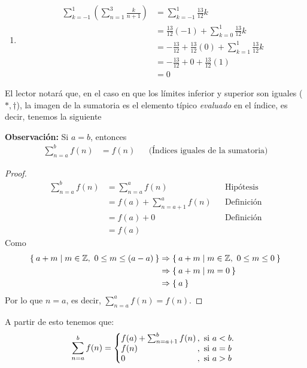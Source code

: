 \begin{enumerate}
  \item \begin{align*}
    \sum_{k=-1}^{1} \left(\sum_{n=1}^{3} \frac{k}{n+1}\right) &= \sum_{k=-1}^{1} \frac{13}{12}k\\
    &= \frac{13}{12} (-1) + \sum_{k=0}^{1} \frac{13}{12}k\\
    &= - \frac{13}{12} + \frac{13}{12} (0) + \sum_{k=1}^{1} \frac{13}{12}k\\
    &= - \frac{13}{12} + 0 + \frac{13}{12} (1)\\
    &= 0
  \end{align*}
\end{enumerate}


  El lector notará que, en el caso en que los límites inferior y superior son iguales ($*, \dag$), la imagen de la sumatoria es el elemento típico \textit{evaluado} en el índice, es decir, tenemos la siguiente

  \textbf{Observación:} Si $a=b$, entonces
  \begin{align*}
    \sum_{n=a}^{b} f(n) &= f(n) && \text{(Índices iguales de la sumatoria)}
  \end{align*}
  
  \begin{proof}\leavevmode
    \begin{align*}
      \sum_{n=a}^{b} f(n) &= \sum_{n=a}^{a} f(n) && \text{Hipótesis}\\
      &= f(a) + \sum_{n=a+1}^{a} f(n) && \text{Definición}\\
      &= f(a) + 0 && \text{Definición}\\
      &= f(a)
    \end{align*}
    Como
    \begin{align*}
      \Set{a+m|m\in \mathbb{Z}, \ 0\leq m\leq (a-a)} &\Rightarrow \Set{a+m|m\in \mathbb{Z}, \ 0\leq m\leq 0}\\
      &\Rightarrow \Set{a+m|m=0}\\
      &\Rightarrow \Set{a}
    \end{align*}
    Por lo que $n=a$, es decir, $\sum_{n=a}^{a} f(n) = f(n)$.
  \end{proof}

  A partir de esto tenemos que:
  \[
    \sum_{n=a}^{b} f(n) = \left\{
    \begin{array}{@{}l@{\thinspace}l}
    f(a) + \sum_{n=a+1}^{b} f(n) &,  \ \text{si}  \ a<b.\\
    f(n) &,  \ \text{si}  \ a=b\\
    0 &,  \ \text{si}  \ a>b
    \end{array} \right. \]

